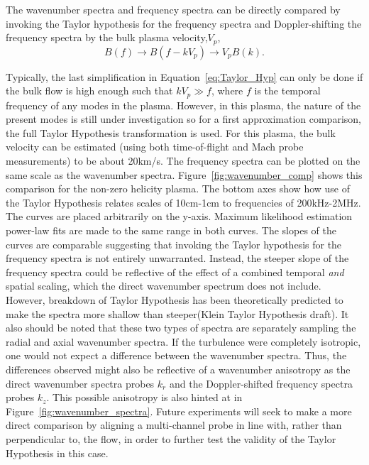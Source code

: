 \documentclass[aip,prl,amsmath,amssymb,reprint,superscriptaddress]{revtex4-1} %
\begin{document}
The wavenumber spectra and frequency spectra can be directly compared by invoking the Taylor hypothesis for the frequency spectra and Doppler-shifting the frequency spectra by the bulk plasma velocity,$V_{p}$,
\begin{equation}
B(f) \longrightarrow B(f-kV_{p}) \longrightarrow V_{p}B(k).
\label{eq:Taylor_Hyp}
\end{equation}

Typically, the last simplification in Equation~\ref{eq:Taylor_Hyp} can only be done if the bulk flow is high enough such that $kV_{p} \gg f$, where $f$ is the temporal frequency of any modes in the plasma. However, in this plasma, the nature of the present modes is still under investigation so for a first approximation comparison, the full Taylor Hypothesis transformation is used. For this plasma, the bulk velocity can be estimated (using both time-of-flight and Mach probe measurements) to be about 20km/s. The frequency spectra can be plotted on the same scale as the wavenumber spectra. Figure~\ref{fig:wavenumber_comp} shows this comparison for the non-zero helicity plasma. The bottom axes show how use of the Taylor Hypothesis relates scales of 10cm-1cm to frequencies of 200kHz-2MHz. The curves are placed arbitrarily on the y-axis. Maximum likelihood estimation power-law fits are made to the same range in both curves. The slopes of the curves are comparable suggesting that invoking the Taylor hypothesis for the frequency spectra is not entirely unwarranted. Instead, the steeper slope of the frequency spectra could be reflective of the effect of a combined temporal {\it and} spatial scaling, which the direct wavenumber spectrum does not include. However, breakdown of Taylor Hypothesis has been theoretically predicted to make the spectra more shallow than steeper(Klein Taylor Hypothesis draft). It also should be noted that these two types of spectra are separately sampling the radial and axial wavenumber spectra. If the turbulence were completely isotropic, one would not expect a difference between the wavenumber spectra. Thus, the differences observed might also be reflective of a wavenumber anisotropy as the direct wavenumber spectra probes $k_{r}$ and the Doppler-shifted frequency spectra probes $k_{z}$. This possible anisotropy is also hinted at in Figure~\ref{fig:wavenumber_spectra}. Future experiments will seek to make a more direct comparison by aligning a multi-channel probe in line with, rather than perpendicular to, the flow, in order to further test the validity of the Taylor Hypothesis in this case.
\end{document}
